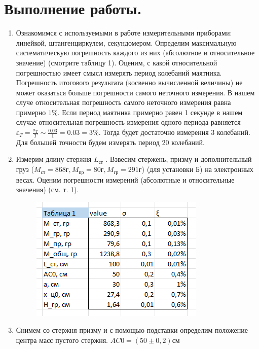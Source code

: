 \documentclass[a4paper,12pt]{article} %
\begin{document}
\section{Выполнение работы.}
\begin{enumerate}

\item Ознакомимся с используемыми в работе измерительными приборами: линейкой, штангенциркулем, секундомером.
Определим максимальную систематическую погрешность каждого из них (абсолютное и относительное значение) (смотрите таблицу 1).
Оценим, с какой относительной погрешностью имеет смысл измерять период колебаний маятника. Погрешность итогового результата (косвенно вычисленной величины) не может оказаться больше погрешности самого неточного измерения.
В нашем случе относительная погрешность самого неточного измерения равна примерно $1\%$.
Если период маятника примерно равен 1 секунде в нашем случае относительная погрешность измерения одного периода равняется $\varepsilon_T = \frac{\sigma_T}{T} \sim \frac{0.03}{1} = 0.03 = 3\%$. Тогда будет достаточно измерения 3 колебаний. Для большей точности будем измерять период 20 колебаний.

\item Измерим длину стержня $L_{\text{ст}}$ . Взвесим стержень, призму и дополнительный
груз ($M_{\text{ст}} = 868 \text{г}, M_{\text{пр}} = 80 \text{г}, M_{\text{гр}} = 291 \text{г}$) (для установки Б) на электронных весах. Оценим погрешности
измерений (абсолютные и относительные значения) (см. т. 1).

\begin{figure} [h]
	\center
	\includegraphics[scale = 0.8]{./141/таблица 1.png}
\end{figure}

\item Снимем со стержня призму и с помощью подставки определим положение центра масс пустого стержня.
$AC0 = (50 \pm 0,2)\text{см}$


\end{enumerate}
\end{document}
